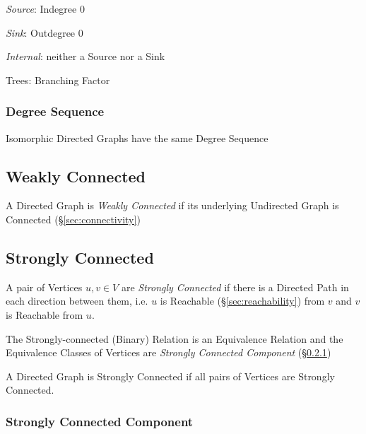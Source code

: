 \emph{Source}: Indegree $0$

\emph{Sink}: Outdegree $0$

\emph{Internal}: neither a Source nor a Sink


Trees: Branching Factor %



\subsubsection{Degree Sequence}\label{sec:degree_sequence}

Isomorphic Directed Graphs have the same Degree Sequence



\subsection{Weakly Connected}\label{sec:weakly_connected}

A Directed Graph is \emph{Weakly Connected} if its underlying
Undirected Graph is Connected (\S\ref{sec:connectivity})



\subsection{Strongly Connected}\label{sec:strongly_connected}

A pair of Vertices $u,v \in V$ are \emph{Strongly Connected} if there
is a Directed Path in each direction between them, i.e. $u$ is
Reachable (\S\ref{sec:reachability}) from $v$ and $v$ is Reachable
from $u$.

The Strongly-connected (Binary) Relation is an Equivalence Relation
and the Equivalence Classes of Vertices are \emph{Strongly Connected
  Component} (\S\ref{sec:strongly_connected_component})

A Directed Graph is Strongly Connected if all pairs of Vertices are
Strongly Connected.



\subsubsection{Strongly Connected Component}
\label{sec:strongly_connected_component}

